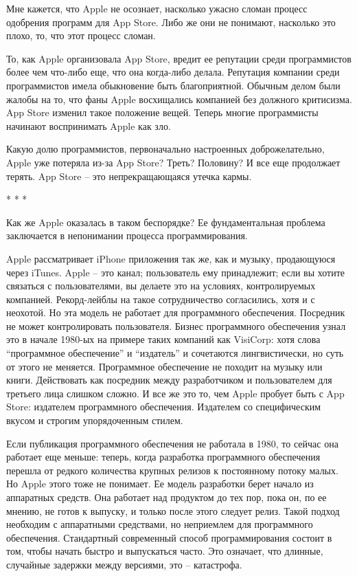 \documentclass[ebook,12pt,oneside,openany]{memoir}
\begin{document}
\maketitle

Мне кажется, что Apple не осознает, насколько ужасно сломан процесс
одобрения программ для App Store. Либо же они не понимают, насколько
это плохо, то, что этот процесс сломан.

То, как Apple организовала App Store, вредит ее репутации среди
программистов более чем что-либо еще, что она когда-либо делала.
Репутация компании среди программистов имела обыкновение быть
благоприятной. Обычным делом были жалобы на то, что фаны Apple
восхищались компанией без должного критисизма. App Store изменил такое
положение вещей. Теперь многие программисты начинают воспринимать
Apple как зло.

Какую долю программистов, первоначально настроенных доброжелательно,
Apple уже потеряла из-за App Store? Треть? Половину? И все еще
продолжает терять. App Store – это непрекращающаяся утечка кармы.

* * *

Как же Apple оказалась в таком беспорядке? Ее фундаментальная проблема
заключается в непонимании процесса программирования.

Apple рассматривает iPhone приложения так же, как и музыку,
продающуюся через iTunes. Apple – это канал; пользователь ему
принадлежит; если вы хотите связаться с пользователями, вы делаете это
на условиях, контролируемых компанией. Рекорд-лейблы на такое
сотрудничество согласились, хотя и с неохотой. Но эта модель не
работает для программного обеспечения. Посредник не может
контролировать пользователя. Бизнес программного обеспечения узнал это
в начале 1980-ых на примере таких компаний как VisiCorp: хотя слова
“программное обеспечение” и “издатель” и сочетаются лингвистически, но
суть от этого не меняется. Программное обеспечение не походит на
музыку или книги. Действовать как посредник между разработчиком и
пользователем для третьего лица слишком сложно. И все же это то, чем
Apple пробует быть с App Store: издателем программного обеспечения.
Издателем со специфическим вкусом и строгим упорядоченным стилем.

Если публикация программного обеспечения не работала в 1980, то сейчас
она работает еще меньше: теперь, когда разработка программного
обеспечения перешла от редкого количества крупных релизов к
постоянному потоку малых. Но Apple этого тоже не понимает. Ее модель
разработки берет начало из аппаратных средств. Она работает над
продуктом до тех пор, пока он, по ее мнению, не готов к выпуску, и
только после этого следует релиз. Такой подход необходим с аппаратными
средствами, но неприемлем для программного обеспечения. Стандартный
современный способ программирования состоит в том, чтобы начать быстро
и выпускаться часто. Это означает, что длинные, случайные задержки
между версиями, это – катастрофа.
\end{document}
